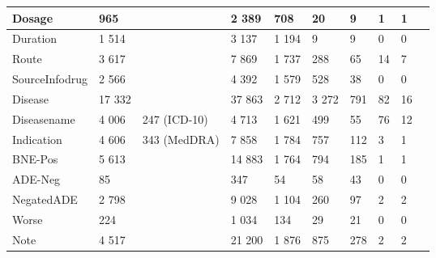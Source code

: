 \begin{tabular}{|l|l|p{}|p{}|p{}|p{}|l|l|l|l|}
\hline
Dosage                                                                             & 965    &      & 2 389 & 708              & 20    & 9                    & 1     & 1                       \\ 
\hline
Duration                                                                           & 1 514    &      & 3 137 & 1 194              & 9     & 9                    & 0     & 0                       \\ 
\hline
Route                                                                              & 3 617  &     & 7 869                           & 1 737              & 288   & 65                   & 14    & 7                       \\ 
\hline
SourceInfodrug                                                                     & 2 566  &       & 4 392 & 1 579              & 528   & 38                   & 0     & 0                       \\ 
\hline
Disease                                                                            & 17 332  &    & 37 863 & 2 712             & 3 272  & 791                  & 82    & 16                      \\ 
\hline
Diseasename                                                                        & 4 006  & 247 (ICD-10)    & 4 713 & 1 621              & 499   & 55                   & 76    & 12                      \\ 
\hline
Indication & 4 606  & 343 (MedDRA) & 7 858 & 1 784              & 757   & 112                  & 3     & 1                       \\ 
\hline
BNE-Pos                                                                            & 5 613  &    & 14 883 & 1 764             & 794   & 185                  & 1     & 1                       \\ 
\hline
ADE-Neg                                                                            & 85    &      & 347 & 54               & 58    & 43                   & 0     & 0                       \\ 
\hline
NegatedADE                                                                         & 2 798  &     & 9 028 & 1 104              & 260   & 97                   & 2     & 2                       \\ 
\hline
Worse                                                                              & 224     &      & 1 034 & 134               & 29    & 21                   & 0     & 0                       \\ 
\hline
Note                                                                               & 4 517  &    & 21 200 & 1 876             & 875   & 278                  & 2     & 2                       \\
\hline
\end{tabular}
